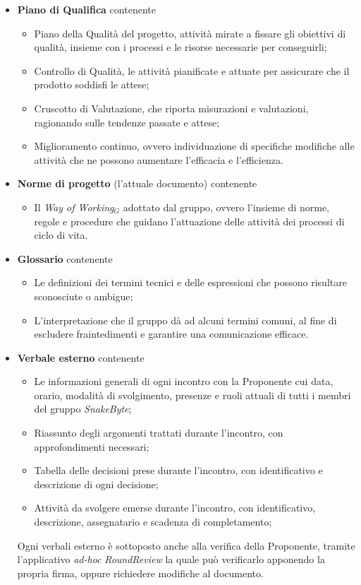 \documentclass[10pt, letterpaper]{article}
\begin{document}
\begin{itemize}
    \item \textbf{Piano di Qualifica} contenente 
          \begin{itemize}
            \item Piano della Qualità del progetto, attività mirate a fissare gli obiettivi di qualità, insieme con i processi e le risorse necessarie per conseguirli;
            \item Controllo di Qualità, le attività pianificate e attuate per assicurare che il prodotto soddisfi le attese;
            \item Cruscotto di Valutazione, che riporta misurazioni e valutazioni, ragionando sulle tendenze passate e attese; 
            \item Miglioramento continuo, ovvero individuazione di specifiche modifiche alle attività che ne possono aumentare l'efficacia e l'efficienza.
          \end{itemize}

    \item \textbf{Norme di progetto} (l'attuale documento) contenente 
          \begin{itemize}
            \item Il \textit{Way of Working$_{G}$} adottato dal gruppo, ovvero l'insieme di norme, regole e procedure che guidano l'attuazione delle attività dei processi di ciclo di vita.
          \end{itemize}

    \item \textbf{Glossario} contenente 
          \begin{itemize}
            \item Le definizioni dei termini tecnici e delle espressioni che possono risultare sconosciute o ambigue;
            \item L'interpretazione che il gruppo dà ad alcuni termini comuni, al fine di escludere fraintedimenti e garantire una comunicazione efficace.
          \end{itemize}

    \item \textbf{Verbale esterno} contenente
          \begin{itemize}
            \item Le informazioni generali di ogni incontro con la Proponente cui data, orario, modalità di svolgimento, presenze e ruoli attuali di tutti i membri del gruppo \textit{SnakeByte};
            \item Riassunto degli argomenti trattati durante l'incontro, con approfondimenti necessari;
            \item Tabella delle decisioni prese durante l'incontro, con identificativo e descrizione di ogni decisione;
            \item Attività da svolgere emerse durante l'incontro, con identificativo, descrizione, assegnatario e scadenza di completamento;
          \end{itemize}
        Ogni verbali esterno è sottoposto anche alla verifica della Proponente, tramite l'applicativo \textit{ad-hoc} \textit{RoundReview} la quale può verificarlo apponendo la propria firma, oppure richiedere modifiche al documento.


\end{itemize}
\end{document}
